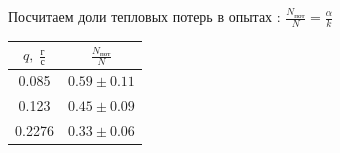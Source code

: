 \documentclass[a4paper,12pt]{article}
\begin{document}
\begin{enumerate}
Посчитаем доли тепловых потерь в опытах : $\frac{N_{пот}}{N} =\frac{\alpha}{k}$

	\begin{center}
	\begin{tabular}{|c|c|}
		\hline
		$q, \; \frac{г}{с}$ & $\frac{N_{пот}}{N}$ \\
		\hline
		0.085 & $0.59 \pm 0.11$ \\
		\hline
		0.123 & $0.45 \pm 0.09$\\
		\hline
		0.2276 & $0.33 \pm 0.06$ \\
		\hline
	\end{tabular}
	\end{center}

\end{enumerate}
\end{document}
